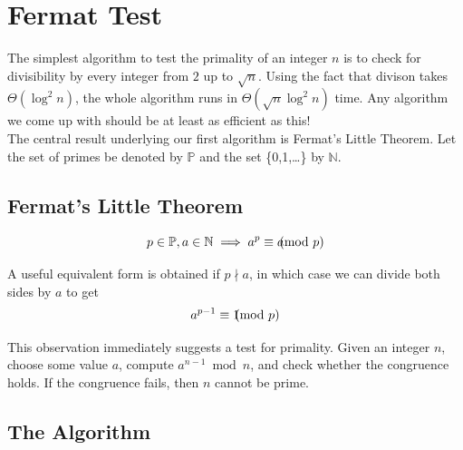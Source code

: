 \section{Fermat Test}

The simplest algorithm to test the primality of an integer \(n\) is to check for 
divisibility by every integer from \(2\) up to \(\sqrt{n}\). Using the fact that divison takes $\Theta(\log^2 n)$, the whole algorithm
runs in \(\Theta(\sqrt{n}\log^2 n)\) time. Any algorithm we come up with should be at least as efficient as this!\\


\noindent The central result underlying our first algorithm is 
Fermat's Little Theorem. Let the set of primes be denoted by \(\mathbb{P}\) and 
the set \{0,1,\dots\} by \(\mathbb{N}\).

\medskip

\subsection{Fermat's Little Theorem}
\[
p \in \mathbb{P}, a \in \mathbb{N} \implies a^{p} \equiv a \hspace{-0.8em} \pmod{p}
\]

\medskip

A useful equivalent form is obtained if $p \nmid a$, in which case we can divide both sides by \(a\) to get
\[
a^{p-1} \equiv 1 \hspace{-0.8em} \pmod p
\]

\medskip

This observation immediately suggests a test for primality. Given an integer \(n\), 
choose some value \(a\), compute \(a^{n-1}\bmod n\), and check whether the congruence holds. If the 
congruence fails, then \(n\) cannot be prime.

\subsection{The Algorithm}

